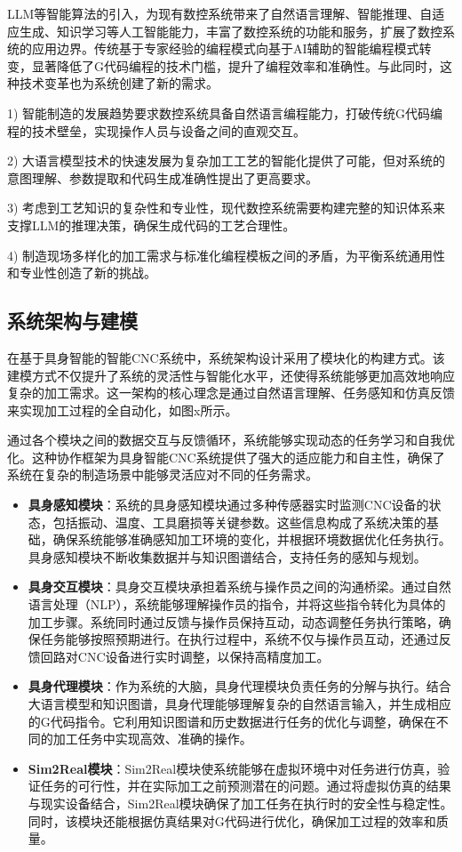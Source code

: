 \documentclass[preprint,12pt]{elsarticle}
\begin{document}
LLM等智能算法的引入，为现有数控系统带来了自然语言理解、智能推理、自适应生成、知识学习等人工智能能力，丰富了数控系统的功能和服务，扩展了数控系统的应用边界。传统基于专家经验的编程模式向基于AI辅助的智能编程模式转变，显著降低了G代码编程的技术门槛，提升了编程效率和准确性。与此同时，这种技术变革也为系统创建了新的需求。

1) 智能制造的发展趋势要求数控系统具备自然语言编程能力，打破传统G代码编程的技术壁垒，实现操作人员与设备之间的直观交互。

2) 大语言模型技术的快速发展为复杂加工工艺的智能化提供了可能，但对系统的意图理解、参数提取和代码生成准确性提出了更高要求。

3) 考虑到工艺知识的复杂性和专业性，现代数控系统需要构建完整的知识体系来支撑LLM的推理决策，确保生成代码的工艺合理性。

4) 制造现场多样化的加工需求与标准化编程模板之间的矛盾，为平衡系统通用性和专业性创造了新的挑战。

\subsection{系统架构与建模}

在基于具身智能的智能CNC系统中，系统架构设计采用了模块化的构建方式。该建模方式不仅提升了系统的灵活性与智能化水平，还使得系统能够更加高效地响应复杂的加工需求。这一架构的核心理念是通过自然语言理解、任务感知和仿真反馈来实现加工过程的全自动化，如图x所示。

通过各个模块之间的数据交互与反馈循环，系统能够实现动态的任务学习和自我优化。这种协作框架为具身智能CNC系统提供了强大的适应能力和自主性，确保了系统在复杂的制造场景中能够灵活应对不同的任务需求。

\begin{itemize}
    \item \textbf{具身感知模块}：系统的具身感知模块通过多种传感器实时监测CNC设备的状态，包括振动、温度、工具磨损等关键参数。这些信息构成了系统决策的基础，确保系统能够准确感知加工环境的变化，并根据环境数据优化任务执行。具身感知模块不断收集数据并与知识图谱结合，支持任务的感知与规划。
    
    \item \textbf{具身交互模块}：具身交互模块承担着系统与操作员之间的沟通桥梁。通过自然语言处理（NLP），系统能够理解操作员的指令，并将这些指令转化为具体的加工步骤。系统同时通过反馈与操作员保持互动，动态调整任务执行策略，确保任务能够按照预期进行。在执行过程中，系统不仅与操作员互动，还通过反馈回路对CNC设备进行实时调整，以保持高精度加工。
    
    \item \textbf{具身代理模块}：作为系统的大脑，具身代理模块负责任务的分解与执行。结合大语言模型和知识图谱，具身代理能够理解复杂的自然语言输入，并生成相应的G代码指令。它利用知识图谱和历史数据进行任务的优化与调整，确保在不同的加工任务中实现高效、准确的操作。
    
    \item \textbf{Sim2Real模块}：Sim2Real模块使系统能够在虚拟环境中对任务进行仿真，验证任务的可行性，并在实际加工之前预测潜在的问题。通过将虚拟仿真的结果与现实设备结合，Sim2Real模块确保了加工任务在执行时的安全性与稳定性。同时，该模块还能根据仿真结果对G代码进行优化，确保加工过程的效率和质量。
\end{itemize}
\end{document}
